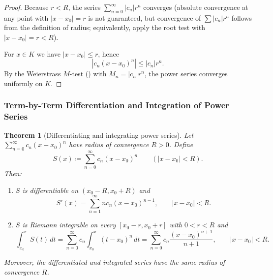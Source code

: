 \documentclass[12pt]{article}
\numberwithin{equation}{section}
\def\abs#1{|#1|}
\def\diff{d}
\DeclarePairedDelimiter{\abs}{\lvert}{\rvert}
\newcommand{\diff}{\mathop{}\!\mathrm{d}}    %
\theoremstyle{plain}
\newtheorem{theorem}{Theorem}[section]
\theoremstyle{definition}
\theoremstyle{remark}
\begin{document}
\begin{proof}
Because $r<R$, the series $\sum_{n=0}^\infty \abs{c_n}r^n$ converges (absolute convergence at any point with $\abs{x-x_0}=r$ is not guaranteed,
but convergence of $\sum \abs{c_n}r^n$ follows from the definition of radius; equivalently, apply the root test with $\abs{x-x_0}=r<R$).

For $x\in K$ we have $\abs{x-x_0}\le r$, hence
\[
\abs{c_n(x-x_0)^n}\le \abs{c_n}r^n.
\]
By the Weierstrass $M$-test () with $M_n=\abs{c_n}r^n$, the power series converges uniformly on $K$.
\end{proof}

\subsubsection{Term-by-Term Differentiation and Integration of Power Series}

\begin{theorem}[Differentiating and integrating power series]\label{thm:power-termwise}
Let $\sum_{n=0}^\infty c_n(x-x_0)^n$ have radius of convergence $R>0$.
Define
\[
S(x)\coloneqq \sum_{n=0}^\infty c_n(x-x_0)^n \qquad (\abs{x-x_0}<R).
\]
Then:
\begin{enumerate}[label=(\alph*)]
\item $S$ is differentiable on $(x_0-R,x_0+R)$ and
\[
S'(x)=\sum_{n=1}^\infty n c_n (x-x_0)^{n-1},\qquad \abs{x-x_0}<R.
\]
\item $S$ is Riemann integrable on every $[x_0-r,x_0+r]$ with $0<r<R$ and
\[
\int_{x_0}^{x} S(t)\,\diff t
=
\sum_{n=0}^\infty c_n \int_{x_0}^{x} (t-x_0)^n\,\diff t
=
\sum_{n=0}^\infty c_n \frac{(x-x_0)^{n+1}}{n+1},
\qquad \abs{x-x_0}<R.
\]
\end{enumerate}
Moreover, the differentiated and integrated series have the same radius of convergence $R$.
\end{theorem}
\end{document}
